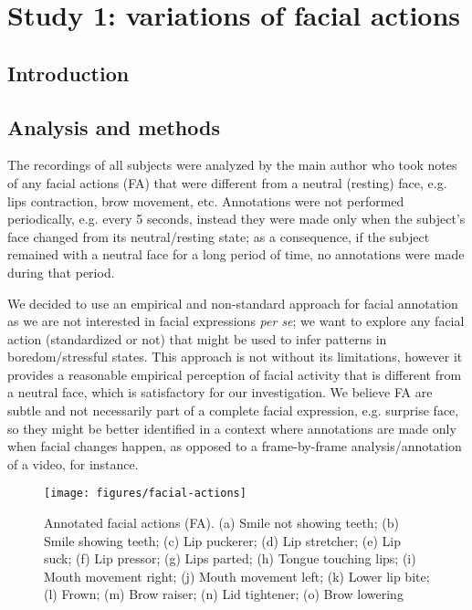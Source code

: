 \section{Study 1: variations of facial actions}

\subsection{Introduction}

\subsection{Analysis and methods}

The recordings of all subjects were analyzed by the main author who took notes of any facial actions (FA) that were different from a neutral (resting) face, e.g. lips contraction, brow movement, etc. Annotations were not performed periodically, e.g. every 5 seconds, instead they were made only when the subject's face changed from its neutral/resting state; as a consequence, if the subject remained with a neutral face for a long period of time, no annotations were made during that period.

We decided to use an empirical and non-standard approach for facial annotation as we are not interested in facial expressions \textit{per se}; we want to explore any facial action (standardized or not) that might be used to infer patterns in boredom/stressful states. This approach is not without its limitations, however it provides a reasonable empirical perception of facial activity that is different from a neutral face, which is satisfactory for our investigation. We believe FA are subtle and not necessarily part of a complete facial expression, e.g. surprise face, so they might be better identified in a context where annotations are made only when facial changes happen, as opposed to a frame-by-frame analysis/annotation of a video, for instance.

\begin{figure}[!t]
\centering
\texttt{[image: figures/facial-actions]}
\caption{Annotated facial actions (FA). (a) Smile not showing teeth; (b) Smile showing teeth; (c) Lip puckerer; (d) Lip stretcher; (e) Lip suck; (f) Lip pressor; (g) Lips parted; (h) Tongue touching lips; (i) Mouth movement right; (j) Mouth movement left; (k) Lower lip bite; (l) Frown; (m) Brow raiser; (n) Lid tightener; (o) Brow lowering}
\label{fig:fu}
\end{figure}

